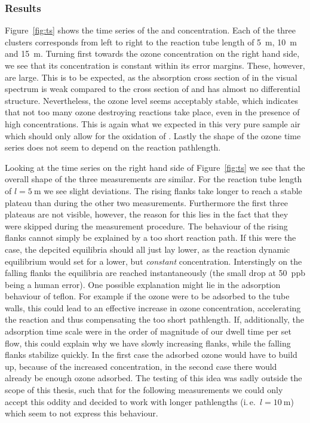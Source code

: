 \subsubsection{Results}
\label{sec:no-results}

Figure~\ref{fig:ts} shows the time series of the  and 
concentration. Each of the three clusters corresponds from left to
right to the reaction tube length of \SI{5}{\meter}, \SI{10}{\meter}
and \SI{15}{\meter}. Turning first towards the ozone concentration on
the right hand side, we see that its concentration is constant within
its error margins. These, however, are large. This is to be expected,
as the absorption cross section of  in the visual spectrum is
weak compared to the cross section of  and has almost no
differential structure. Nevertheless, the ozone level seems acceptably
stable, which indicates that not too many ozone destroying reactions
take place, even in the presence of high  concentrations. This
is again what we expected in this very pure sample air which should
only allow for the oxidation of . Lastly the shape of the ozone
time series does not seem to depend on the reaction pathlength.

Looking at the  time series on the right hand side of
Figure~\ref{fig:ts} we see that the overall shape of the three
measurements are similar. For the reaction tube length of $l=
\SI{5}{\meter}$ we see slight deviations. The rising flanks take
longer to reach a stable plateau than during the other two
measurements. Furthermore the first three plateaus are not visible,
however, the reason for this lies in the fact that they were skipped
during the measurement procedure. The behaviour of the rising flanks
cannot simply be explained by a too short reaction path. If this were
the case, the depcited equilibria should all just lay lower, as the
reaction dynamic equilibrium would set for a lower, but
\emph{constant}  concentration. Interstingly on the falling
flanks the equilibria are reached instantaneously (the small drop at
\SI{50}{ppb} being a human error). One possible explanation might lie
in the adsorption behaviour of teflon. For example if the ozone were
to be adsorbed to the tube walls, this could lead to an effective
increase in ozone concentration, accelerating the reaction and thus
compensating the too short pathlength. If, additionally, the
adsorption time scale were in the order of magnitude of our dwell time
per set flow, this could explain why we have slowly increasing flanks,
while the falling flanks stabilize quickly. In the first case the
adsorbed ozone would have to build up, because of the increased
concentration, in the second case there would already be enough ozone
adsorbed. The testing of this idea was sadly outside the scope of this
thesis, such that for the following measurements we could only accept
this oddity and decided to work with longer pathlengths (i.\,e.~$l =
\SI{10}{\meter}$) which seem to not express this behaviour.

